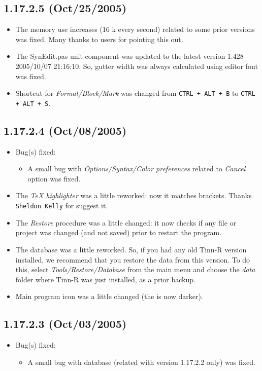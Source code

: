 \subsection*{1.17.2.5 (Oct/25/2005)}
\begin{itemize}
  \item The memory use increases (16 k every second) related to
    some prior versions was fixed. Many thanks to users for pointing this out.
  \item The SynEdit.pas unit component was updated to the latest version
    1.428 2005/10/07 21:16:10. So, gutter width was always calculated
    using editor font was fixed.
  \item Shortcut for \textit{Format/Block/Mark} was changed from
    \texttt{CTRL + ALT + B} to \texttt{CTRL + ALT + S}.
\end{itemize}


\subsection*{1.17.2.4 (Oct/08/2005)}
\begin{itemize}
  \item Bug(s) fixed:
    \begin{itemize}
      \item A small bug with \textit{Options/Syntax/Color preferences}
        related to \textit{Cancel} option was fixed.
    \end{itemize}
  \item The \textit{TeX highlighter} was a little reworked: now it
    matches brackets. Thanks \texttt{Sheldon Kelly} for suggest it.
  \item The \textit{Restore} procedure was a little changed: it now
    checks if any file or project was changed (and not saved) prior
    to restart the program.
  \item The database was a little reworked. So, if you had any old
    Tinn-R version installed, we recommend that you restore the
    data from this version. To do this, select \textit{Tools/Restore/Database}
    from the main menu and choose the \textit{data} folder where Tinn-R
    was just installed, as a prior backup.
  \item Main program icon was a little changed (the \RR{} is now darker).
\end{itemize}


\subsection*{1.17.2.3 (Oct/03/2005)}
\begin{itemize}
  \item Bug(s) fixed:
    \begin{itemize}
      \item A small bug with database (related with version 1.17.2.2 only)
        was fixed.
    \end{itemize}
\end{itemize}


